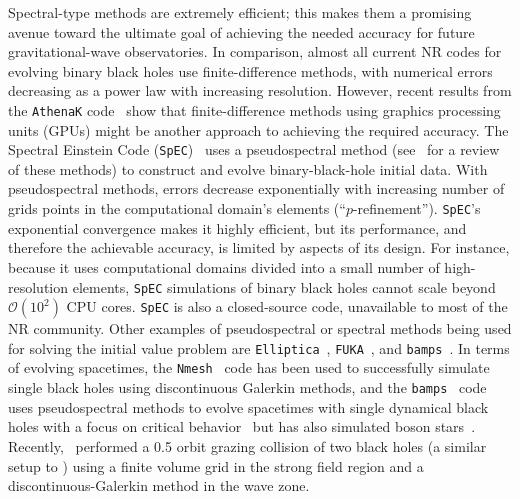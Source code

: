 \begin{bibunit}[unsrtnat]
Spectral-type methods are extremely efficient; this makes them a promising
avenue toward the ultimate goal of achieving the needed accuracy for future
gravitational-wave observatories. In comparison, almost all current NR codes for
evolving binary black holes use finite-difference methods, with numerical errors
decreasing as a power law with increasing resolution. However, recent results
from the \texttt{AthenaK} code~\cite{Zhu:2024utz} show that finite-difference
methods using graphics processing units (GPUs) might be another approach to
achieving the required accuracy. The Spectral Einstein Code
(\texttt{SpEC})~\cite{SpECwebsite} uses a pseudospectral method
(see~\cite{Hesthaven2007} for a review of these methods) to construct and evolve
binary-black-hole initial data. With pseudospectral methods, errors decrease
exponentially with increasing number of grids points in the computational
domain's elements (``$p$-refinement''). \texttt{SpEC}'s exponential convergence
makes it highly efficient, but its performance, and therefore the achievable
accuracy, is limited by aspects of its design. For instance, because it uses
computational domains divided into a small number of high-resolution elements,
\texttt{SpEC} simulations of binary black holes cannot scale beyond
$\mathcal{O}(10^2)$ CPU cores. \texttt{SpEC} is also a closed-source code,
unavailable to most of the NR community. Other examples of pseudospectral or
spectral methods being used for solving the initial value problem are
\texttt{Elliptica}~\cite{Rashti:2021ihv},
\texttt{FUKA}~\cite{Papenfort:2021hod}, and \texttt{bamps}~\cite{Ruter:2017iph}.
In terms of evolving spacetimes, the \texttt{Nmesh}~\cite{Tichy:2022hpa} code
has been used to successfully simulate single black holes using discontinuous
Galerkin methods, and the \texttt{bamps}~\cite{Hilditch:2015aba,
Bugner:2015gqa} code uses pseudospectral methods to evolve spacetimes with
single dynamical black holes with a focus on critical
behavior~ but has also simulated boson stars~\cite{Atteneder:2023pge}.
Recently,~\cite{Dumbser:2024tvm} performed a 0.5 orbit grazing collision of two
black holes (a similar setup to \cite{Alcubierre:2000ke}) using a finite volume
grid in the strong field region and a discontinuous-Galerkin method in the wave 
zone.


\end{bibunit}

